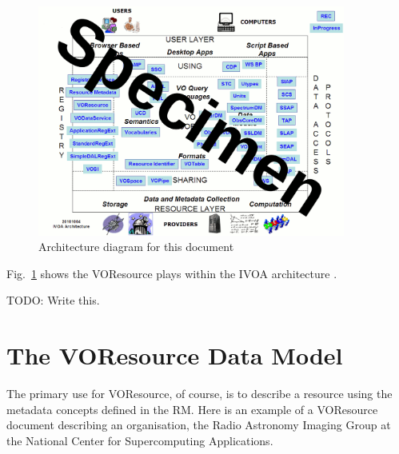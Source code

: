 \documentclass[11pt,a4paper]{ivoa}
\begin{document}
\begin{figure}
\centering

\includegraphics[width=0.9\textwidth]{archdiag.png}
\caption{Architecture diagram for this document}
\label{fig:archdiag}
\end{figure}

Fig.~\ref{fig:archdiag} shows the VOResource plays within the
IVOA architecture \citep{note:VOARCH}.

TODO: Write this.


\section{The VOResource Data Model}
\label{sect:model}

The primary use for VOResource, of course, is to describe a resource
using the metadata concepts defined in the RM.  Here is an example of a
VOResource document describing an organisation, the Radio Astronomy
Imaging Group at the National Center for Supercomputing Applications.  
\end{document}

